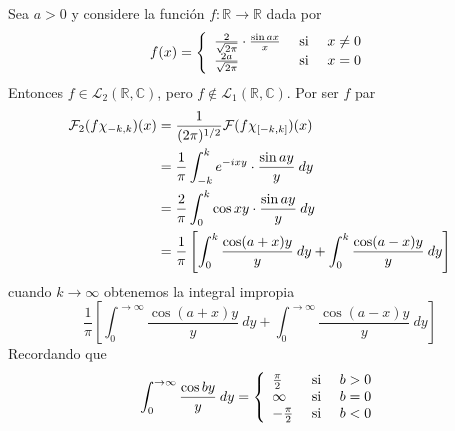 \documentclass[12pt]{report}
\newcounter{it}
\theoremstyle{largebreak}
\newcommand\cf[3]{\ensuremath{#1:#2\rightarrow#3}}
\newcommand{\fou}[1]{\ensuremath{\mathcal{F}#1}}
\begin{document}
    \begin{exa}
        Sea $a>0$ y considere la función $\cf{f}{\mathbb{R}}{\mathbb{R}}$ dada por
        \begin{equation*}
            f(x)=\left\{
                \begin{array}{lcr}
                    \frac{2}{\sqrt{2\pi}}\cdot\frac{\sin ax}{x} & \textup{ si } & x\neq0\\
                    \frac{2a}{\sqrt{2\pi}} & \textup{ si } & x=0\\
                \end{array}
            \right.
        \end{equation*}
        Entonces $f\in\mathcal{L}_2(\mathbb{R},\mathbb{C})$, pero $f\notin\mathcal{L}_1(\mathbb{R},\mathbb{C})$. Por ser $f$ par
        \begin{equation*}
            \begin{split}
                \fou_2{(f\chi_{ {-k,k}})}(x)&=\frac{1}{(2\pi)^{ 1/2}}\fou{(f\chi_{[-k,k]})}(x)\\
                &=\frac{1}{\pi}\int_{ -k}^k e^{ -ixy}\cdot\frac{\sin ay}{y}\:dy\\
                &=\frac{2}{\pi}\int_0^k\cos xy\cdot\frac{\sin ay}{y}\:dy\\
                &=\frac{1}{\pi}\left[\int_0^k \frac{\cos(a+x)y}{y}\:dy+\int_0^k \frac{\cos(a-x)y}{y}\:dy \right]\\
            \end{split}
        \end{equation*}
        cuando $k\rightarrow\infty$ obtenemos la integral impropia
        \begin{equation*}
            \frac{1}{\pi}\left[\int_0^{\rightarrow\infty} \frac{\cos(a+x)y}{y}\:dy+\int_0^{\rightarrow\infty} \frac{\cos(a-x)y}{y}\:dy \right]
        \end{equation*}
        Recordando que
        \begin{equation*}
            \int_{0}^{\rightarrow\infty}\frac{\cos by}{y}\:dy=\left\{
                \begin{array}{lcr}
                    \frac{\pi}{2} & \textup{ si } & b>0\\
                    \infty & \textup{ si } & b=0\\
                    -\frac{\pi}{2} & \textup{ si } & b<0\\
                \end{array}
            \right.
        \end{equation*}

\end{exa}
\end{document}
